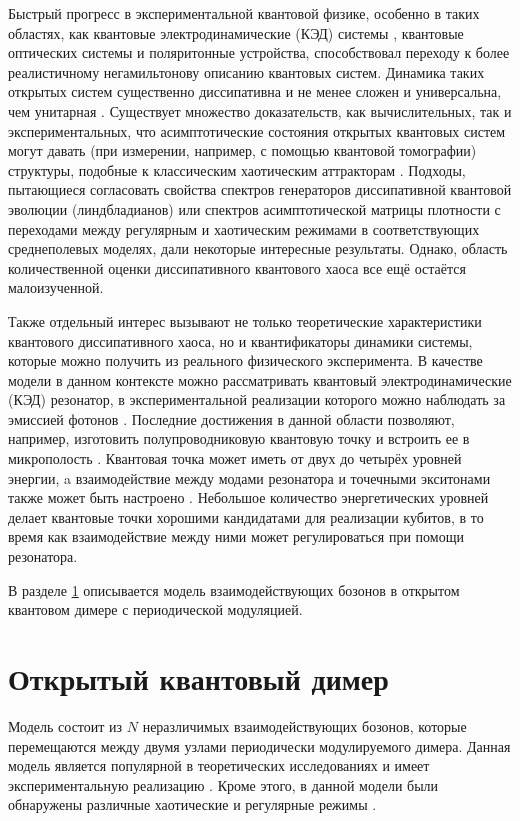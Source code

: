 Быстрый прогресс в экспериментальной квантовой физике, особенно в таких областях, как квантовые электродинамические (КЭД) системы \cite{Walther2006}, квантовые оптических системы \cite{Aspelmeyer2014} и поляритонные устройства\cite{Feurer2003}, способствовал переходу к более реалистичному негамильтонову описанию квантовых систем. 
Динамика таких открытых систем существенно диссипативна и не менее сложен и универсальна, чем унитарная \cite{Diehl2008, Budich2015}. 
Существует множество доказательств, как вычислительных, так и экспериментальных, что асимптотические состояния открытых квантовых систем могут давать (при измерении, например, с помощью квантовой томографии) структуры, подобные к классическим хаотическим аттракторам \cite{Spiller1994, Brun1996, Hartmann2017, Ivanchenko2017, Carlo2017, Wang2018}. 
Подходы, пытающиеся согласовать свойства спектров генераторов диссипативной квантовой эволюции (линдбладианов) \cite{book2007} или спектров асимптотической матрицы плотности \cite{Hartmann2017, Ivanchenko2017, Prosen2013} с переходами между регулярным и хаотическим режимами в соответствующих среднеполевых моделях, дали некоторые интересные результаты. Однако, область количественной оценки диссипативного квантового хаоса все ещё остаётся малоизученной.

Также отдельный интерес вызывают не только теоретические характеристики квантового диссипативного хаоса, но и квантификаторы динамики системы, которые можно получить из реального физического эксперимента. 
В качестве модели в данном контексте можно рассматривать  квантовый электродинамические (КЭД) резонатор, в экспериментальной реализации которого можно наблюдать за эмиссией фотонов \cite{Walther2006, Arakawa2015}.
Последние достижения в данной области позволяют, например, изготовить полупроводниковую квантовую точку и встроить ее в микрополость \cite{Arakawa2015}. 
Квантовая точка может иметь от двух до четырёх уровней энергии, a взаимодействие между модами резонатора и точечными экситонами также может быть настроено \cite{Reithmaier2004, Hennessy2007}. 
Небольшое количество энергетических уровней делает квантовые точки хорошими кандидатами для реализации кубитов, в то время как взаимодействие между ними может регулироваться при помощи резонатора.

В разделе \cref{sec:ch3/dimer} описывается модель взаимодействующих бозонов в открытом квантовом димере с периодической модуляцией.

\section{Открытый квантовый димер}\label{sec:ch3/dimer}
Модель состоит из \(N\) неразличимых взаимодействующих бозонов, которые перемещаются между двумя узлами периодически модулируемого димера. 
Данная модель является популярной в теоретических исследованиях \cite{Vardi2001, Trimborn2008, Poletti2012} и имеет экспериментальную реализацию \cite{Gross2010, Tomkovic2017}. Кроме этого, в данной модели были обнаружены различные хаотические и регулярные режимы \cite{Hartmann2017, Ivanchenko2017, Carlo2017, Wang2018}. 


